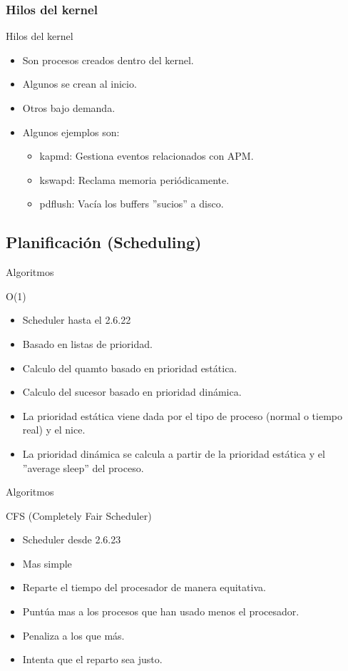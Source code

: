 \subsubsection{Hilos del kernel}
\begin{frame}{Hilos del kernel}
	\begin{itemize}
		\item Son procesos creados dentro del kernel.
		\item Algunos se crean al inicio.
		\item Otros bajo demanda.
		\item Algunos ejemplos son:
		\begin{itemize}
			\item kapmd: Gestiona eventos relacionados con APM.
			\item kswapd: Reclama memoria periódicamente.
			\item pdflush: Vacía los buffers ''sucios'' a disco.
		\end{itemize}
	\end{itemize}
\end{frame}

\subsection{Planificación (Scheduling)}
\begin{frame}{Algoritmos}
	\begin{block}{O(1)}
		\begin{itemize}
			\item Scheduler hasta el 2.6.22
			\item Basado en listas de prioridad.
			\item Calculo del quamto basado en prioridad estática.
			\item Calculo del sucesor basado en prioridad dinámica.
			\item La prioridad estática viene dada por el tipo de proceso (normal o tiempo real) y el nice.
			\item La prioridad dinámica se calcula a partir de la prioridad estática y el ''average sleep'' del proceso.
		\end{itemize}
	\end{block}
\end{frame}

\begin{frame}{Algoritmos}
	\begin{block}{CFS (Completely Fair Scheduler)}
		\begin{itemize}
			\item Scheduler desde 2.6.23
			\item Mas simple
			\item Reparte el tiempo del procesador de manera equitativa.
			\item Puntúa mas a los procesos que han usado menos el procesador.
			\item Penaliza a los que más.
			\item Intenta que el reparto sea justo.
		\end{itemize}
	\end{block}
\end{frame}

